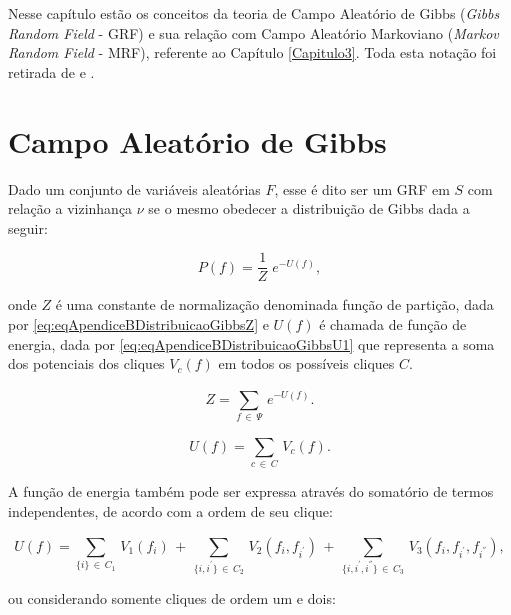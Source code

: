 Nesse capítulo estão os conceitos da teoria de Campo Aleatório de Gibbs (\textit{Gibbs Random Field} - \acs{GRF}) e sua relação com Campo Aleatório Markoviano (\textit{Markov Random Field} - \acs{MRF}), referente ao Capítulo \ref{Capitulo3}. Toda esta notação foi retirada de  e .

\section{Campo Aleatório de Gibbs}\label{ApendiceB:CampoAleatóriodeGibbs}

Dado um conjunto de variáveis aleatórias $F$, esse é dito ser um \acs{GRF} em $S$ com relação a vizinhança $\nu$ se o mesmo obedecer a distribuição de Gibbs dada a seguir:

\begin{equation}
	P(f) = \frac{1}{Z}\; e^{-U(f)},
	\label{eq:eqApendiceBDistribuicaoGibbs}
\end{equation}

\noindent onde $Z$ é uma constante de normalização denominada função de partição, dada por \eqref{eq:eqApendiceBDistribuicaoGibbsZ} e $U(f)$ é chamada de função de energia, dada por \eqref{eq:eqApendiceBDistribuicaoGibbsU1} que representa a soma dos potenciais dos cliques $V_{c}(f)$ em todos os possíveis cliques $C$. 

\begin{equation}
	Z = \sum_{f \,\in\, \varPsi}^{} \, e^{-U(f)}. 
	\label{eq:eqApendiceBDistribuicaoGibbsZ}
\end{equation}

\begin{equation}
	U(f) = \sum_{c \,\in\, C}^{} \, V_{c}(f).
	\label{eq:eqApendiceBDistribuicaoGibbsU1}
\end{equation}

A função de energia também pode ser expressa através do somatório de termos independentes, de acordo com a ordem de seu clique:

\begin{equation}
	U(f) = \sum_{\{i\} \,\in\, C_{1}}^{} \, V_{1}(f_{i}) \,+\, \sum_{\{i,i^{'}\} \,\in\, C_{2}}^{} \, V_{2}(f_{i},f_{i^{'}}) \,+\, \sum_{\{i,i^{'},i^{''}\} \,\in\, C_{3}}^{} \, V_{3}(f_{i},f_{i^{'}},f_{i^{''}}),
	\label{eq:eqApendiceBDistribuicaoGibbsU2}
\end{equation}  

\noindent ou considerando somente cliques de ordem um e dois:

